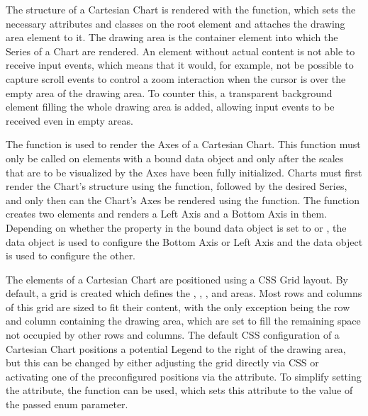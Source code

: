 The structure of a Cartesian Chart is rendered with the
 function, which sets the necessary
attributes and classes on the root element and attaches the drawing area
 element to it. The drawing area is the container element
into which the Series of a Chart are rendered. An 
element without actual content is not able to receive input events,
which means that it would, for example, not be possible to capture
scroll events to control a zoom interaction when the cursor is over
the empty area of the drawing area. To counter this, a transparent
 background element filling the whole drawing area is
added, allowing input events to be received even in empty areas.

The  function is used to render the
Axes of a Cartesian Chart. This function must only be called on
elements with a bound  data object and only after
the scales that are to be visualized by the Axes have been fully
initialized. Charts must first render the Chart's structure using the
 function, followed by the desired Series,
and only then can the Chart's Axes be rendered using the
 function. The
 function creates two 
elements and renders a Left Axis and a Bottom Axis in them. Depending
on whether the  property in the bound data object is set
to  or , the  data object is used
to configure the Bottom Axis or Left Axis and the  data
object is used to configure the other. 

The elements of a Cartesian Chart are positioned using a CSS Grid
layout. By default, a grid is created which defines the
, , , and
 areas. Most rows and columns of this grid are sized to
fit their content, with the only exception being the row and column
containing the drawing area, which are set to fill the remaining space
not occupied by other rows and columns. The default CSS configuration
of a Cartesian Chart positions a potential Legend to the right of the
drawing area, but this can be changed by either adjusting the grid
directly via CSS or activating one of the preconfigured positions via
the  attribute. To simplify setting the
 attribute, the
 function can be used, which sets this
attribute to the value of the passed  enum
parameter.






